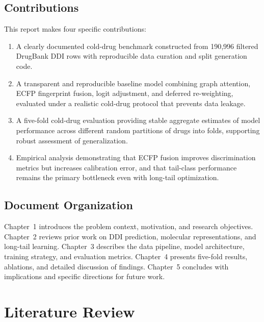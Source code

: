 \documentclass[11pt,a4paper]{report}
\begin{document}
\section{Contributions}
This report makes four specific contributions:
\begin{enumerate}
\item A clearly documented cold-drug benchmark constructed from 190{,}996 filtered DrugBank DDI rows with reproducible data curation and split generation code.
\item A transparent and reproducible baseline model combining graph attention, ECFP fingerprint fusion, logit adjustment, and deferred re-weighting, evaluated under a realistic cold-drug protocol that prevents data leakage.
\item A five-fold cold-drug evaluation providing stable aggregate estimates of model performance across different random partitions of drugs into folds, supporting robust assessment of generalization.
\item Empirical analysis demonstrating that ECFP fusion improves discrimination metrics but increases calibration error, and that tail-class performance remains the primary bottleneck even with long-tail optimization.
\end{enumerate}
\section{Document Organization}
Chapter~1 introduces the problem context, motivation, and research objectives. Chapter~2 reviews prior work on DDI prediction, molecular representations, and long-tail learning. Chapter~3 describes the data pipeline, model architecture, training strategy, and evaluation metrics. Chapter~4 presents five-fold results, ablations, and detailed discussion of findings. Chapter~5 concludes with implications and specific directions for future work.

\chapter{Literature Review}
\end{document}
